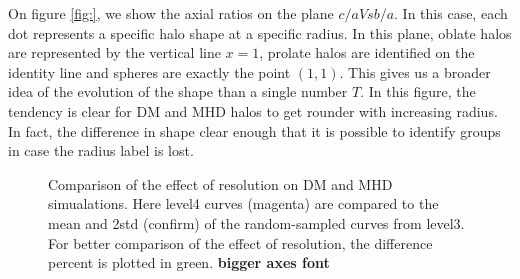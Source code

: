 On figure \ref{fig:}, we show the axial ratios on the plane $c/a Vs b/a$. In this case, each dot represents a specific halo shape at a specific radius. In this plane, oblate halos are represented by the vertical line $x = 1$, prolate halos are identified on the identity line and spheres are exactly the point $(1,1)$. This gives us a broader idea of the evolution of the shape than a single number $T$. In this figure, the tendency is clear for DM and MHD halos to get rounder with increasing radius. In fact, the difference in shape clear enough that it is possible to identify groups in case the radius label is lost.\\

\begin{figure}[!ht]
  \centering
  \hfill
  \caption{Comparison of the effect of resolution on DM and MHD simualations. Here level4 curves (magenta) are compared to the mean and 2std (confirm) of the random-sampled curves from level3. For better comparison of the effect of resolution, the difference percent is plotted in green.  \textbf{bigger axes font}}
\end{figure}

